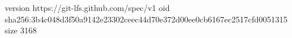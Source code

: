 version https://git-lfs.github.com/spec/v1
oid sha256:3b4c048d3f50a9142e23302ceec44d70e372d00ee0cb6167ec2517cfd0051315
size 3168
